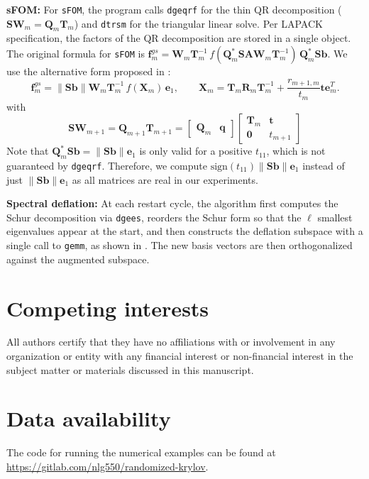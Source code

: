 \documentclass[smallextended]{svjour3}
\renewcommand{\vec}[1]{\mathbf{#1}}
\newcommand{\mat}[1]{\mathbf{#1}}
\begin{document}
\begin{appendix}
\textbf{sFOM:} For \texttt{sFOM}, the program calls \texttt{dgeqrf} for the thin QR decomposition \linebreak ($\mat{SW}_m = \mat{Q}_m \mat{T}_m$) and \texttt{dtrsm} for the triangular linear solve. Per LAPACK specification, the factors of the QR decomposition are stored in a single object. The original formula \cite{guttel_randomized_2023} for \texttt{sFOM} is $\vec{f}_m^{gs} = \mat{W}_m \mat{T}_m^{-1} \, f(\mat{Q}_m^* \mat{S AW}_m \mat{T}_m^{-1}) \, \mat{Q}_m^*  \mat{S} \vec{b}$. We use the alternative form proposed in \cite[Eq. 18]{palitta_sketched_2025}:
\begin{equation}
\vec{f}_m^{gs} = \| \mat{S} \vec{b} \| \mat{W}_m \mat{T}_m^{-1} \, f(\mat{X}_m) \, \vec{e}_1, \qquad \mat{X}_m = \mat{T}_m \mat{R}_m \mat{T}_m^{-1} + \frac{r_{m + 1, m}}{t_m} \vec{t} \vec{e}_m^T.
\end{equation}
with
\begin{equation*}
\mat{S W}_{m + 1} = \mat{Q}_{m + 1} \mat{T}_{m + 1} = \begin{bmatrix} \mat{Q}_m &  \vec{q} \end{bmatrix} \begin{bmatrix} \mat{T}_m & \vec{t} \\ \vec{0} & t_{m + 1}  \end{bmatrix}
\end{equation*}
Note that $\mat{Q}_m^*  \mat{S} \vec{b} = \| \mat{S} \vec{b} \| \vec{e}_1$ is only valid for a positive $t_{11}$, which is not guaranteed by \texttt{dgeqrf}. Therefore, we compute $\text{sign}(t_{11}) \| \mat{S} \vec{b} \| \vec{e}_1$ instead of just $\| \mat{S} \vec{b} \| \vec{e}_1$ as all matrices are real in our experiments.

\textbf{Spectral deflation:} At each restart cycle, the algorithm first computes the Schur decomposition via \texttt{dgees}, reorders the Schur form so that the $\ell$ smallest eigenvalues appear at the start, and then constructs the deflation subspace with a single call to \texttt{gemm}, as shown in \cite{eiermann_deflated_2011}. The new basis vectors are then orthogonalized against the augmented subspace.

\end{appendix}

\section*{Competing interests}

All authors certify that they have no affiliations with or involvement in any organization or entity with any financial interest or non-financial interest in the subject matter or materials discussed in this manuscript.

\section*{Data availability}

The code for running the numerical examples can be found at \url{https://gitlab.com/nlg550/randomized-krylov}.



\end{document}
